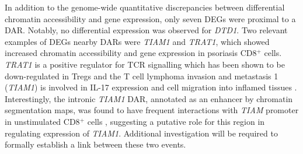 

In addition to the genome-wide quantitative discrepancies between differential chromatin accessibility and gene expression, only seven DEGs were proximal to a DAR. Notably, no differential expression was observed for \textit{DTD1}. Two relevant examples of DEGs nearby DARs were \textit{TIAM1} and \textit{TRAT1}, which showed increased chromatin accessibility and gene expression in psoriasis CD8$^+$ cells. \textit{TRAT1} is a positive regulator for TCR signalling which has been shown to be down-regulated in Tregs \parencite{Birzele2011} and the T cell lymphoma invasion and metastasis 1 (\textit{TIAM1}) is involved in IL-17 expression and cell migration into inflamed tissues \parencite{Kurdi2016, Gerard2009}. Interestingly, the intronic \textit{TIAM1} DAR, annotated as an enhancer by chromatin segmentation maps, was found to have frequent interactions with \textit{TIAM} promoter in unstimulated CD8$^+$ cells \parencite{Javierre2016}, suggesting a putative role for this region in regulating expression of \textit{TIAM1}. Additional investigation will be required to formally establish a link between these two events.



